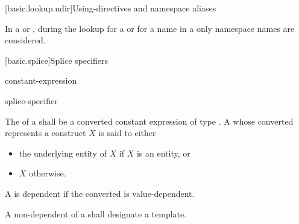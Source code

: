 [basic.lookup.udir]{Using-directives and namespace aliases}

\pnum
{}%
%
In a  or ,
during the lookup for a  or for a name in a
only namespace names are considered.%
%

[basic.splice]{Splice specifiers}
%

\begin{bnf}
\br
  \terminal{[:} constant-expression \terminal{:]}
\end{bnf}

\begin{bnf}
\br
  splice-specifier \terminal{<}  \terminal{>}
\end{bnf}

\pnum
The  of a 
shall be a converted constant expression of
type .
A 
whose converted  represents
a construct $X$ is said to  either
\begin{itemize}
\item the underlying entity of $X$ if $X$ is an entity, or
\item $X$ otherwise.
\end{itemize}
\begin{note}
A  is dependent
if the converted  is
value-dependent.
\end{note}

\pnum
A non-dependent  of
a  shall designate a template.

